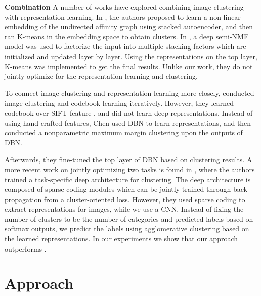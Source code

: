 \documentclass[10pt,twocolumn,letterpaper]{article}
\begin{document}
\noindent \textbf{Combination}
A number of works have explored combining image clustering with representation learning. In \cite{tian2014learning}, the authors proposed to learn a non-linear embedding of the undirected affinity graph using stacked autoencoder, and then ran K-means in the embedding space to obtain clusters. In \cite{trigeorgis2014deep}, a deep semi-NMF model was used to factorize the input into multiple stacking factors which are initialized and updated layer by layer. Using the representations on the top layer, K-means was implemented to get the final results. Unlike our work, they do not jointly optimize for the representation learning and clustering.

To connect image clustering and representation learning more closely, \cite{xie2015integrating} conducted image clustering and codebook learning iteratively. However, they learned codebook over SIFT feature \cite{lowe1999object}, {and did not learn deep representations}. Instead of using hand-crafted features, Chen \cite{chen2015deep} used DBN to learn representations, and then conducted a nonparametric maximum margin clustering upon the outputs of DBN. {Afterwards, they fine-tuned the top layer of DBN based on clustering results. A {more} recent work on jointly optimizing two tasks is found in \cite{wang2015learning}, where the authors trained a task-specific deep architecture for clustering. The deep architecture is composed of sparse coding modules which can be jointly trained through back propagation from a cluster-oriented loss. However, {they used sparse coding to extract representations for images, while we use a CNN. Instead of fixing the number of clusters to be the number of categories and predicted labels based on softmax outputs, we predict the labels using agglomerative clustering based on the learned representations. In our experiments we show that our approach outperforms \cite{wang2015learning}}.

\section{Approach}
\vspace{-5pt}
}
\end{document}
